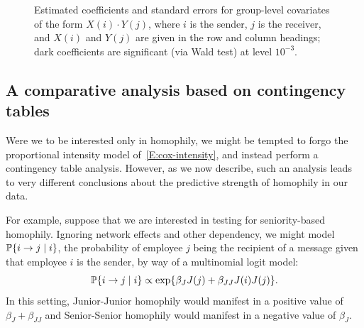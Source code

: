 \documentclass[final]{statsoc}
\begin{document}
\begin{figure}
  \centering
  \makebox[\textwidth]{
    \scriptsize
    
  }
  \caption{
    Estimated coefficients and standard errors for group-level covariates
    of the form $X(i) \cdot Y(j)$, where $i$ is the sender, $j$ is the
    receiver, and $X(i)$ and $Y(j)$ are given in the row and column
    headings; dark coefficients are significant (via Wald test) at
    level $10^{-3}$.
  }
  \label{T:group-dynamic}
\end{figure}


\subsection{A comparative analysis based on contingency tables}\label{sec:contin-analysis}

Were we to be interested only in homophily, we might be tempted to forgo
the proportional intensity model of~\eqref{E:cox-intensity}, and instead
perform a contingency table analysis.  However, as we now describe,
such an analysis leads to very different conclusions
about the predictive strength of homophily in our data.

For example, suppose that we are interested in testing for seniority-based homophily.  Ignoring
network effects and other dependency, we might model $\mathbb{P}\{ i \to j \mid i
\}$, the probability of employee $j$ being the recipient of a message given
that employee $i$ is the sender, by way of a multinomial logit model:
\[
  \mathbb{P}\{ i \to j \mid i \}
    \propto \exp\{ \beta_J J(j) + \beta_{JJ} J(i) J(j) \}.
\]
In this setting,
Junior-Junior homophily would manifest in a positive value of
$\beta_{J} + \beta_{JJ}$ and Senior-Senior homophily would manifest in
a negative value of $\beta_J$.
\end{document}
